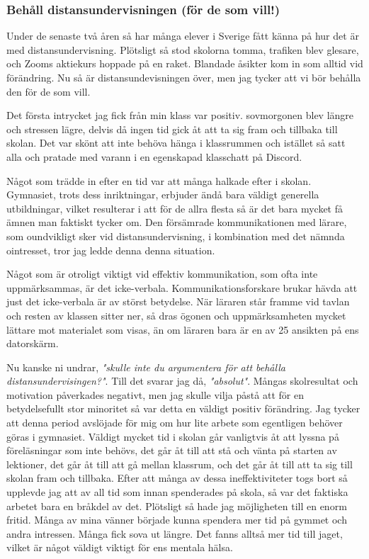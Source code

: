 \subsubsection{Behåll distansundervisningen (för de som vill!)}

Under de senaste två åren så har många elever i Sverige fått känna på hur det är med distansundervisning. Plötsligt så stod skolorna tomma, trafiken blev glesare, och Zooms aktiekurs hoppade på en raket. Blandade åsikter kom in som alltid vid förändring. Nu så är distansundevisningen över, men jag tycker att vi bör behålla den för de som vill.

Det första intrycket jag fick från min klass var positiv. sovmorgonen blev längre och stressen lägre, delvis då ingen tid gick åt att ta sig fram och tillbaka till skolan. Det var skönt att inte behöva hänga i klassrummen och istället så satt alla och pratade med varann i en egenskapad klasschatt på Discord.

Något som trädde in efter en tid var att många halkade efter i skolan. Gymnasiet, trots dess inriktningar, erbjuder ändå bara väldigt generella utbildningar, vilket resulterar i att för de allra flesta så är det bara mycket få ämnen man faktiskt tycker om. Den försämrade kommunikationen med lärare, som oundvikligt sker vid distansundervisning, i kombination med det nämnda ointresset, tror jag ledde denna denna situation.

Något som är otroligt viktigt vid effektiv kommunikation, som ofta inte uppmärksammas, är det icke-verbala. Kommunikationsforskare brukar hävda att just det icke-verbala är av störst betydelse. När läraren står framme vid tavlan och resten av klassen sitter ner, så dras ögonen och uppmärksamheten mycket lättare mot materialet som visas, än om läraren bara är en av 25 ansikten på ens datorskärm.

Nu kanske ni undrar, \textit{"skulle inte du argumentera för att behålla distansundervisingen?"}. Till det svarar jag då, \textit{"absolut"}. Mångas skolresultat och motivation påverkades negativt, men jag skulle vilja påstå att för en betydelsefullt stor minoritet så var detta en väldigt positiv förändring. Jag tycker att denna period avslöjade för mig om hur lite arbete som egentligen behöver göras i gymnasiet. Väldigt mycket tid i skolan går vanligtvis åt att lyssna på föreläsningar som inte behövs, det går åt till att stå och vänta på starten av lektioner, det går åt till att gå mellan klassrum, och det går åt till att ta sig till skolan fram och tillbaka. Efter att många av dessa ineffektiviteter togs bort så upplevde jag att av all tid som innan spenderades på skola, så var det faktiska arbetet bara en bråkdel av det. Plötsligt så hade jag möjligheten till en enorm fritid. Många av mina vänner började kunna spendera mer tid på gymmet och andra intressen. Många fick sova ut längre. Det fanns alltså mer tid till jaget, vilket är något väldigt viktigt för ens mentala hälsa.

